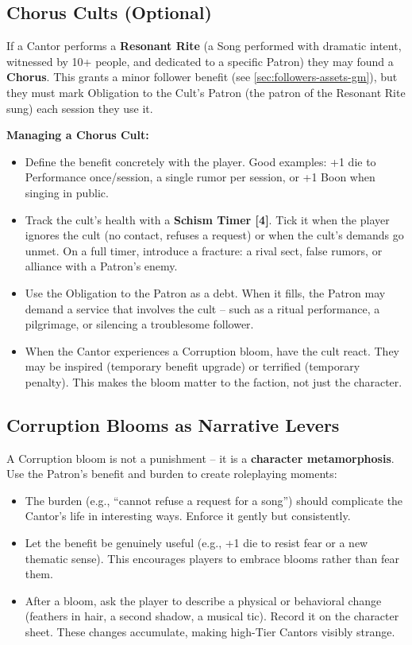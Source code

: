 \subsection*{Chorus Cults (Optional)}
\label{subsec:chorus-cults-gm}
If a Cantor performs a \textbf{Resonant Rite} (a Song performed with dramatic intent, witnessed by 10+ people, and dedicated to a specific Patron) they may found a \textbf{Chorus}. This grants a minor follower benefit (see \ref{sec:followers-assets-gm}), but they must mark Obligation to the Cult's Patron (the patron of the Resonant Rite sung) each session they use it.

\textbf{Managing a Chorus Cult:}
\begin{itemize}
  \item Define the benefit concretely with the player. Good examples: +1 die to Performance once/session, a single rumor per session, or +1 Boon when singing in public.
  \item Track the cult's health with a \textbf{Schism Timer [4]}. Tick it when the player ignores the cult (no contact, refuses a request) or when the cult's demands go unmet. On a full timer, introduce a fracture: a rival sect, false rumors, or alliance with a Patron's enemy.
  \item Use the Obligation to the Patron as a debt. When it fills, the Patron may demand a service that involves the cult -- such as a ritual performance, a pilgrimage, or silencing a troublesome follower.
  \item When the Cantor experiences a Corruption bloom, have the cult react. They may be inspired (temporary benefit upgrade) or terrified (temporary penalty). This makes the bloom matter to the faction, not just the character.
\end{itemize}

\subsection*{Corruption Blooms as Narrative Levers}
\label{subsec:corruption-blooms}
A Corruption bloom is not a punishment -- it is a \textbf{character metamorphosis}. Use the Patron's benefit and burden to create roleplaying moments:
\begin{itemize}
  \item The burden (e.g., ``cannot refuse a request for a song'') should complicate the Cantor's life in interesting ways. Enforce it gently but consistently.
  \item Let the benefit be genuinely useful (e.g., +1 die to resist fear or a new thematic sense). This encourages players to embrace blooms rather than fear them.
  \item After a bloom, ask the player to describe a physical or behavioral change (feathers in hair, a second shadow, a musical tic). Record it on the character sheet. These changes accumulate, making high-Tier Cantors visibly strange.
\end{itemize}

